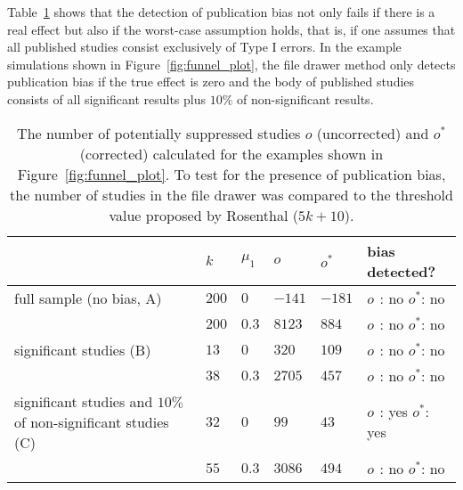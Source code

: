 Table~\ref{tab:file_drawer} shows that the detection of publication bias not only fails if there is a real effect but also if the worst-case assumption holds, that is, if one assumes that all published studies consist exclusively of Type I errors. In the example simulations shown in Figure~\ref{fig:funnel_plot}, the file drawer method only detects publication bias if the true effect is zero and the body of published studies consists of all significant results plus $10\%$ of non-significant results.\par
\begin{table}[h!]
  \begin{center}
    \begin{tabular}{ >{\raggedright\let\\\tabularnewline}p{} | >{\raggedleft\let\\\tabularnewline}p{}| >{\raggedleft\let\\\tabularnewline}p{} | >{\raggedleft\let\\\tabularnewline}p{} | >{\raggedleft\let\\\tabularnewline}p{} | >{\raggedright\let\\\tabularnewline}p{}} 
    \hline
     & $k$\TBstrut & $\mu_1$ & $o$ & $o^*$ & bias detected?\\
    \hline
    full sample (no bias, A)\Tstrut & $200$ & $0$ & $-141$ & $-181$ & $o\phantom{^*}$: no $o^*$: no \\ 
    & $200$\Bstrut & $0.3$ & $8123$ & $884$ & $o\phantom{^*}$: no $o^*$: no\\
    \hline
    significant studies (B)\Tstrut& $13$ & $0$ & $320$ & $109$ & $o\phantom{^*}$: no $o^*$: no \\
    & $38$\Bstrut & $0.3$ & $2705$ & $457$ & $o\phantom{^*}$: no $o^*$: no \\
    \hline
    \Tstrut significant studies and $10\%$ of non-significant studies (C)& $32$ & $0$ & $99$ & $43$ & $o\phantom{^*}$: yes $o^*$: yes \\
    & $55$\Bstrut & $0.3$ & $3086$ & $494$ & $o\phantom{^*}$: no $o^*$: no\\
 \hline
\end{tabular}
    \caption[File drawer estimates to detect Publication bias.]{The number of potentially suppressed studies $o$ (uncorrected) and $o^*$ (corrected) calculated for the examples shown in Figure~\ref{fig:funnel_plot}. To test for the presence of publication bias, the number of studies in the file drawer was compared to the threshold value proposed by Rosenthal ($5k+10$).}
    \label{tab:file_drawer}
  \end{center}
\end{table}
